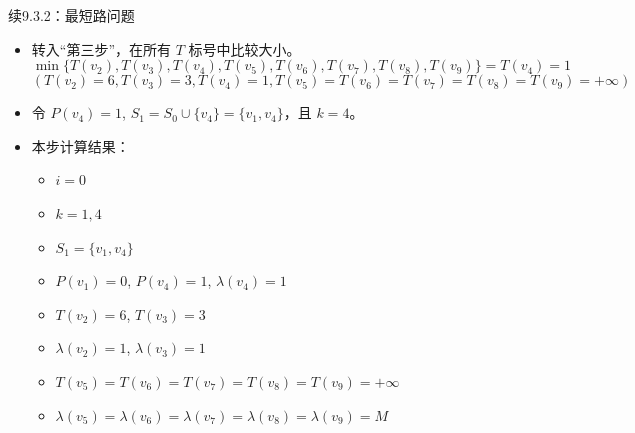 \begin{exbox}{续9.3.2：最短路问题}{}
\begin{enumerate}[label=(\arabic*)]
\begin{itemize}
\begin{itemize}
				\end{itemize}
				\item 转入“第三步”，在所有 \( T \) 标号中比较大小。
				\[
				\min\{T(v_2), T(v_3), T(v_4), T(v_5), T(v_6), T(v_7), T(v_8), T(v_9)\} = T(v_4) = 1
				\]
				\[
				(T(v_2) = 6, T(v_3) = 3, T(v_4) = 1, T(v_5) = T(v_6) = T(v_7) = T(v_8) = T(v_9) = +\infty)
				\]
				\item 令 \( P(v_4) = 1 \), \( S_1 = S_0 \cup \{v_4\} = \{v_1, v_4\} \)，且 \( k = 4 \)。
				\item 本步计算结果：
				\begin{itemize}
					\item \( i = 0 \)
					\item \( k = 1, 4 \)
					\item \( S_1 = \{v_1, v_4\} \)
					\item \( P(v_1) = 0 \), \( P(v_4) = 1 \), \( \lambda(v_4) = 1 \)
					\item \( T(v_2) = 6 \), \( T(v_3) = 3 \)
					\item \( \lambda(v_2) = 1 \), \( \lambda(v_3) = 1 \)
					\item \( T(v_5) = T(v_6) = T(v_7) = T(v_8) = T(v_9) = +\infty \)
					\item \( \lambda(v_5) = \lambda(v_6) = \lambda(v_7) = \lambda(v_8) = \lambda(v_9) = M \)
				\end{itemize}
			\end{itemize}
		

\end{enumerate}
\end{exbox}
